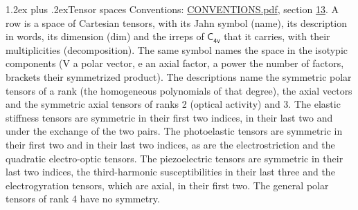 \documentclass[10pt,a4paper]{article}
\makeatletter
\renewcommand\section{\@startsection{section}{1}{\z@}{-3ex plus -1ex minus -.2ex}%
  {1.2ex plus .2ex}{\normalfont\large\sffamily\bfseries\color{parttitle}}}
\numberwithin{equation}{section}
\newcommand{\grp}[1]{\mathsf{#1}}
\makeatother
\begin{document}
\section{Tensor spaces}\label{s:tensor_spaces}
Conventions: \href{../../CONVENTIONS.pdf}{CONVENTIONS.pdf}, section \href{../../CONVENTIONS.pdf\#conv.13}{13}.
\leavevmode\label{n:head.name}\label{n:head.description}\label{n:head.dim}\label{n:head.decomposition}A row is a space of Cartesian tensors, with its Jahn symbol (name), its description in words, its dimension (dim) and the irreps of $\grp{C_{4v}}$ that it carries, with their multiplicities (decomposition). \label{n:label.jahn}The same symbol names the space in the isotypic components (V a polar vector, e an axial factor, a power the number of factors, brackets their symmetrized product). The descriptions name the symmetric polar tensors of a rank (the homogeneous polynomials of that degree), the axial vectors and the symmetric axial tensors of ranks 2 (optical activity) and 3. The elastic stiffness tensors are symmetric in their first two indices, in their last two and under the exchange of the two pairs. The photoelastic tensors are symmetric in their first two and in their last two indices, as are the electrostriction and the quadratic electro-optic tensors. The piezoelectric tensors are symmetric in their last two indices, the third-harmonic susceptibilities in their last three and the electrogyration tensors, which are axial, in their first two. The general polar tensors of rank 4 have no symmetry.
\end{document}
